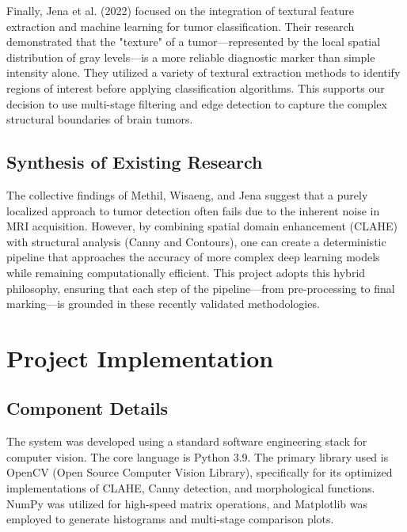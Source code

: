 \documentclass[12pt,a4paper,oneside]{report}
\begin{document}
Finally, Jena et al. (2022) focused on the integration of textural feature extraction and machine learning for tumor classification. Their research demonstrated that the "texture" of a tumor—represented by the local spatial distribution of gray levels—is a more reliable diagnostic marker than simple intensity alone. They utilized a variety of textural extraction methods to identify regions of interest before applying classification algorithms. This supports our decision to use multi-stage filtering and edge detection to capture the complex structural boundaries of brain tumors.

\newpage
\section{Synthesis of Existing Research}
The collective findings of Methil, Wisaeng, and Jena suggest that a purely localized approach to tumor detection often fails due to the inherent noise in MRI acquisition. However, by combining spatial domain enhancement (CLAHE) with structural analysis (Canny and Contours), one can create a deterministic pipeline that approaches the accuracy of more complex deep learning models while remaining computationally efficient. This project adopts this hybrid philosophy, ensuring that each step of the pipeline—from pre-processing to final marking—is grounded in these recently validated methodologies.

\lipsum[3-4]

\chapter{Project Implementation}
\section{Component Details}
The system was developed using a standard software engineering stack for computer vision. The core language is Python 3.9. The primary library used is OpenCV (Open Source Computer Vision Library), specifically for its optimized implementations of CLAHE, Canny detection, and morphological functions. NumPy was utilized for high-speed matrix operations, and Matplotlib was employed to generate histograms and multi-stage comparison plots.
\end{document}
